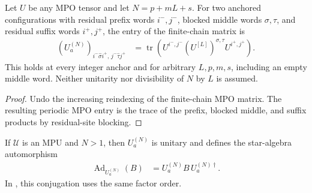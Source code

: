 \begin{lemma}
    \label{thm:mpu_anchored_residual_mpo_entry}
    \leanok
    Let $U$ be any MPO tensor and let $N=p+mL+s$. For two anchored
    configurations with residual prefix words $i^-,j^-$, blocked middle
    words $\sigma,\tau$, and residual suffix words $i^+,j^+$, the entry
    of the finite-chain matrix is
    \begin{align}
        (U_a^{(N)})_{i^-\widehat\sigma i^+,\,
                j^-\widehat\tau j^+}
         & =\operatorname{tr}\!\left(
        U^{i^-,j^-}(U^{[L]})^{\sigma,\tau}U^{i^+,j^+}\right).
    \end{align}
    This holds at every integer anchor and for arbitrary $L,p,m,s$,
    including an empty middle word. Neither unitarity nor divisibility
    of $N$ by $L$ is assumed.
\end{lemma}

\begin{proof}\leanok
    Undo the increasing reindexing of the finite-chain MPO matrix. The
    resulting periodic MPO entry is the trace of the prefix, blocked
    middle, and suffix products by residual-site blocking.
\end{proof}

\begin{definition}
    \label{def:mpu_finite_chain_conjugation}
    \leanok
    If $\mathcal U$ is an MPU and $N>1$, then $U_a^{(N)}$ is unitary and
    defines the star-algebra automorphism
    \begin{align}
        \operatorname{Ad}_{U_a^{(N)}}(B)
         & =U_a^{(N)}B\,U_a^{(N)\dagger}.
    \end{align}
    In \cite[lines~2300--2306]{Cirac2017MPU}, this conjugation uses the same factor
    order.
\end{definition}

